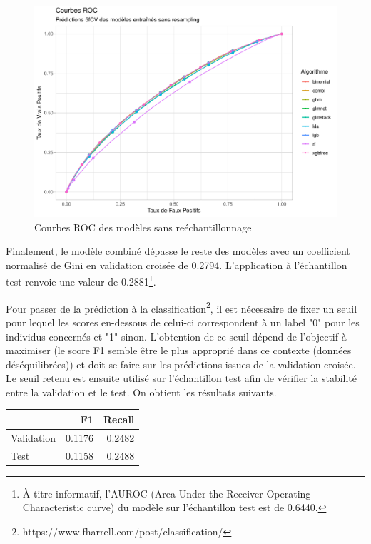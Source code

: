\documentclass[french]{article}
\begin{document}
\begin{multicols}{2}
\begin{figure}[H] \centering
  \includegraphics[width = \columnwidth]{img/roc_curves}
  \caption{Courbes ROC des modèles sans reéchantillonnage}
\end{figure}

Finalement, le modèle combiné dépasse le reste des modèles avec un coefficient normalisé de Gini en validation croisée de 0.2794. L'application à l'échantillon test renvoie une valeur de 0.2881\footnote{À titre informatif, l'AUROC (Area Under the Receiver Operating Characteristic curve) du modèle sur l'échantillon test est de 0.6440.}.

Pour passer de la prédiction à la classification\footnote{{https://www.fharrell.com/post/classification/}}, il est nécessaire de fixer un seuil pour lequel les scores en-dessous de celui-ci correspondent à un label "0" pour les individus concernés et "1" sinon. L'obtention de ce seuil dépend de l'objectif à maximiser (le score F1 semble être le plus approprié dans ce contexte (données déséquilibrées)) et doit se faire sur les prédictions issues de la validation croisée. Le seuil retenu est ensuite utilisé sur l'échantillon test afin de vérifier la stabilité entre la validation et le test. On obtient les résultats suivants.

\begin{center}\begin{tabular}{l|rr}
  & F1 & Recall \\ \hline
  Validation & 0.1176 & 0.2482 \\
  Test & 0.1158 & 0.2488
\end{tabular}\end{center}



\end{multicols}
\end{document}
